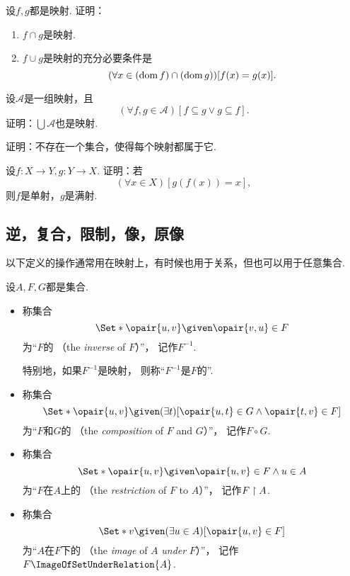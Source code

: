\begin{example}
设\(f,g\)都是映射.
证明：
\begin{enumerate}
	\item \(f \cap g\)是映射.
	\item \(f \cup g\)是映射的充分必要条件是\[
		(\forall x \in (\operatorname{dom} f)\cap(\operatorname{dom} g))[f(x)=g(x)].
	\]
\end{enumerate}
\end{example}

\begin{example}
\def\A{\mathscr{A}}%
设\(\A\)是一组映射，且\[
	(\forall f,g\in\A)[f \subseteq g \lor g \subseteq f].
\]
证明：\(\bigcup\A\)也是映射.
\end{example}

\begin{example}
证明：不存在一个集合，使得每个映射都属于它.
\end{example}

\begin{example}
设\(f\colon X \to Y,
g\colon Y \to X\).
证明：若\[
	(\forall x \in X)[g(f(x)) = x],
\]
则\(f\)是单射，\(g\)是满射.
\end{example}

\subsection{逆，复合，限制，像，原像}
以下定义的操作通常用在映射上，有时候也用于关系，但也可以用于任意集合.
\begin{definition}\label{definition:映射.逆-复合-限制-像}
设\(A,F,G\)都是集合.
\begin{itemize}
	\item 称集合\[
		\Set*{ \opair{u,v} \given \opair{v,u} \in F }
	\]为“\(F\)的%
	（the \emph{inverse} of \(F\)）”，
	记作\(F^{-1}\).

	特别地，如果\(F^{-1}\)是映射，
	则称“\(F^{-1}\)是\(F\)的”.

	\item 称集合\[
		\Set*{ \opair{u,v} \given (\exists t)[\opair{u,t} \in G \land \opair{t,v} \in F] }
	\]为“\(F\)和\(G\)的%
	（the \emph{composition} of \(F\) and \(G\)）”，
	记作\(F \circ G\).

	\item 称集合\[
		\Set*{ \opair{u,v} \given \opair{u,v} \in F \land u \in A }
	\]为“\(F\)在\(A\)上的%
	（the \emph{restriction} of \(F\) to \(A\)）”，
	记作\(F \upharpoonright A\).

	\item 称集合\[
		\Set*{ v \given (\exists u \in A)[\opair{u,v} \in F] }
	\]为“\(A\)在\(F\)下的%
	（the \emph{image} of \(A\) \emph{under} \(F\)）”，
	记作\(F\ImageOfSetUnderRelation{A}\).
\end{itemize}
\end{definition}

